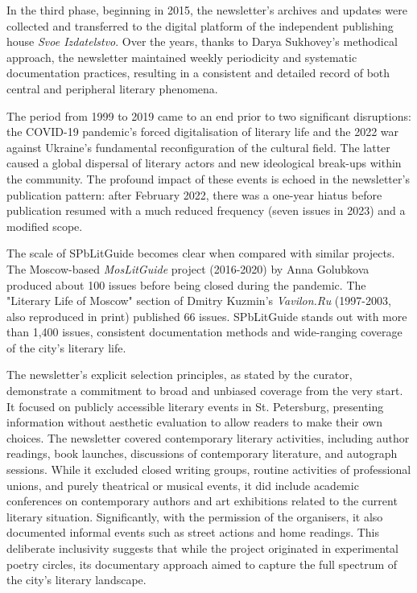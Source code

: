 \documentclass{jcls}
\begin{document}
In the third phase, beginning in 2015, the newsletter's archives and updates were collected and transferred to the digital platform of the independent publishing house \textit{Svoe Izdatelstvo}. Over the years, thanks to Darya Sukhovey's methodical approach, the newsletter maintained weekly periodicity and systematic documentation practices, resulting in a consistent and detailed record of both central and peripheral literary phenomena.

The period from 1999 to 2019 came to an end prior to two significant disruptions: the COVID-19 pandemic's forced digitalisation of literary life and the 2022 war against Ukraine's fundamental reconfiguration of the cultural field. The latter caused a global dispersal of literary actors and new ideological break-ups within the community. The profound impact of these events is echoed in the newsletter's publication pattern: after February 2022, there was a one-year hiatus before publication resumed with a much reduced frequency (seven issues in 2023) and a modified scope.

The scale of SPbLitGuide becomes clear when compared with similar projects. The Moscow-based \textit{MosLitGuide} project (2016-2020) by Anna Golubkova produced about 100 issues before being closed during the pandemic. The "Literary Life of Moscow" section of Dmitry Kuzmin's \textit{Vavilon.Ru} (1997-2003, also reproduced in print) published 66 issues. SPbLitGuide stands out with more than 1,400 issues, consistent documentation methods and wide-ranging coverage of the city's literary life.

The newsletter's explicit selection principles, as stated by the curator, demonstrate a commitment to broad and unbiased coverage from the very start. It focused on publicly accessible literary events in St. Petersburg, presenting information without aesthetic evaluation to allow readers to make their own choices. The newsletter covered contemporary literary activities, including author readings, book launches, discussions of contemporary literature, and autograph sessions. While it excluded closed writing groups, routine activities of professional unions, and purely theatrical or musical events, it did include academic conferences on contemporary authors and art exhibitions related to the current literary situation. Significantly, with the permission of the organisers, it also documented informal events such as street actions and home readings. This deliberate inclusivity suggests that while the project originated in experimental poetry circles, its documentary approach aimed to capture the full spectrum of the city's literary landscape.
\end{document}
